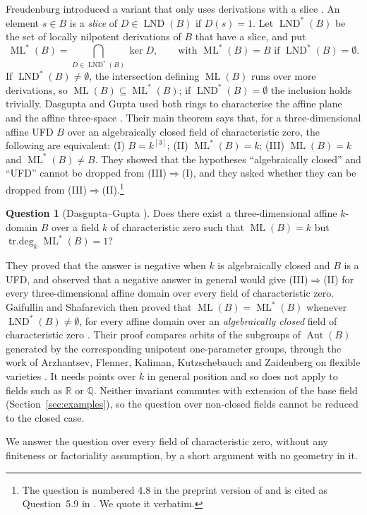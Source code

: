 \documentclass[11pt]{amsart}
\theoremstyle{definition}
\newtheorem*{question}{Question}
\newcommand{\RR}{\mathbb{R}}
\newcommand{\QQ}{\mathbb{Q}}
\DeclareMathOperator{\ML}{ML}
\DeclareMathOperator{\LND}{LND}
\DeclareMathOperator{\Aut}{Aut}
\DeclareMathOperator{\trdeg}{tr.deg}
\newcommand{\MLs}{\ML^{*}}
\newcommand{\LNDs}{\LND^{*}}
\newcommand{\td}[1]{\trdeg_k #1}
\begin{document}
Freudenburg introduced a variant that only uses derivations with a slice \cite{Fre17}. An element $s\in B$ is a \emph{slice} of $D\in\LND(B)$ if $D(s)=1$. Let $\LNDs(B)$ be the set of locally nilpotent derivations of $B$ that have a slice, and put
\[
\MLs(B)=\bigcap_{D\in\LNDs(B)}\ker D,\qquad\text{with }\MLs(B)=B\text{ if }\LNDs(B)=\emptyset .
\]
If $\LNDs(B)\neq\emptyset$, the intersection defining $\ML(B)$ runs over more derivations, so $\ML(B)\subseteq\MLs(B)$; if $\LNDs(B)=\emptyset$ the inclusion holds trivially. Dasgupta and Gupta used both rings to characterise the affine plane and the affine three-space \cite{DG21}. Their main theorem says that, for a three-dimensional affine UFD $B$ over an algebraically closed field of characteristic zero, the following are equivalent: (I) $B=k^{[3]}$; (II) $\MLs(B)=k$; (III) $\ML(B)=k$ and $\MLs(B)\neq B$. They showed that the hypotheses ``algebraically closed'' and ``UFD'' cannot be dropped from (III)$\Rightarrow$(I), and they asked whether they can be dropped from (III)$\Rightarrow$(II).\footnote{The question is numbered 4.8 in the preprint version of \cite{DG21} and is cited as Question~5.9 in \cite{GS24}. We quote it verbatim.}

\begin{question}[Dasgupta--Gupta \cite{DG21}]
Does there exist a three-dimensional affine $k$-domain $B$ over a field $k$ of characteristic zero such that $\ML(B)=k$ but $\td{\MLs(B)}=1$?
\end{question}

They proved that the answer is negative when $k$ is algebraically closed and $B$ is a UFD, and observed that a negative answer in general would give (III)$\Rightarrow$(II) for every three-dimensional affine domain over every field of characteristic zero. Gaifullin and Shafarevich then proved that $\ML(B)=\MLs(B)$ whenever $\LNDs(B)\neq\emptyset$, for every affine domain over an \emph{algebraically closed} field of characteristic zero \cite[Theorem~1]{GS24}. Their proof compares orbits of the subgroups of $\Aut(B)$ generated by the corresponding unipotent one-parameter groups, through the work of Arzhantsev, Flenner, Kaliman, Kutzschebauch and Zaidenberg on flexible varieties \cite{AFKKZ13}. It needs points over $k$ in general position and so does not apply to fields such as $\RR$ or $\QQ$. Neither invariant commutes with extension of the base field (Section~\ref{sec:examples}), so the question over non-closed fields cannot be reduced to the closed case.

We answer the question over every field of characteristic zero, without any finiteness or factoriality assumption, by a short argument with no geometry in it.
\end{document}
